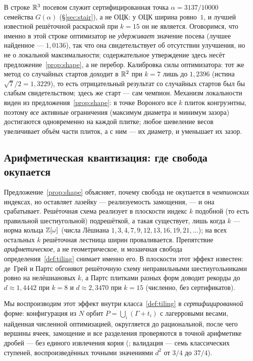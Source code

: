 В строке $\mathbb{R}^3$ посевом служит сертифицированная точка
$\alpha=3137/10000$ семейства $G(\alpha)$ (\S\ref{sec:stair}), а не ОЦК:
у ОЦК ширина ровно~$1$, и лучшей известной решёточной раскраской при $k=15$
он не является. Оговоримся, что именно в этой строке оптимизатор не
\emph{удерживает} значение посева (лучшее найденное --- $1{,}0136$), так что
она свидетельствует об отсутствии улучшения, но не о локальной максимальности;
содержательное утверждение здесь несёт предложение~\ref{prop:shape}, а не
перебор. Калибровка силы оптимизатора: тот же метод со случайных стартов
доходит в $\mathbb{R}^2$ при $k=7$ лишь до $1{,}2396$ (истина $\sqrt7/2=1{,}3229$),
то есть отрицательный результат со случайных стартов был бы слабым
свидетельством; здесь же старт --- сам чемпион.
Механизм локальности виден из предложения~\ref{prop:shape}: в точке Вороного
все $k$ плиток конгруэнтны, поэтому \emph{все} активные ограничения (максимум
диаметра и минимум зазора) достигаются одновременно на каждой плитке; любое
шевеление весов увеличивает объём части плиток, а с ним --- их диаметр, и
уменьшает их зазор.

\subsection{Арифметическая квантизация: где свобода окупается}
\label{ssec:quant}

Предложение~\ref{prop:shape} объясняет, почему свобода не окупается в
\emph{чемпионских} индексах, но оставляет лазейку --- реализуемость
замощения, --- и она срабатывает. Решёточная схема реализует в плоскости
индекс $k$ подобной (то есть правильной шестиугольной) подрешёткой, а такая
существует, лишь когда $k$ --- норма кольца $\mathbb{Z}[\omega]$ (числа Лёшиана
$1,3,4,7,9,12,13,16,19,21,\dots$); на всех остальных $k$ решёточная лестница
ширин проваливается. Препятствие \emph{арифметическое}, а не геометрическое,
и мозаичная свобода определения~\ref{def:tiling} снимает именно его. В
плоскости этот эффект известен: де~Грей и Партс \cite{deGreyParts} обгоняют
решёточную схему неправильными шестиугольниками ровно на нелёшиановых $k$, а
Партс \cite{Parts2023} плитками разных форм доводит рекорды до
$d\approx1{,}4442$ при $k=8$ и $d\approx2{,}3470$ при $k=15$ (численно, без
сертификатов).

Мы воспроизводим этот эффект внутри класса~\ref{def:tiling} в
\emph{сертифицированной} форме: конфигурация из $N$ орбит
$P=\bigcup_i(\Gamma+t_i)$ с лагерровыми весами, найденная численной
оптимизацией, округляется до рациональной, после чего вершины ячеек, замощение
и все разделения проверяются в точной арифметике дробей --- без единого
извлечения корня
(; валидация ---
семь классических ступеней,
воспроизведённых точными значениями $d^2$ от $3/4$ до $37/4$).

